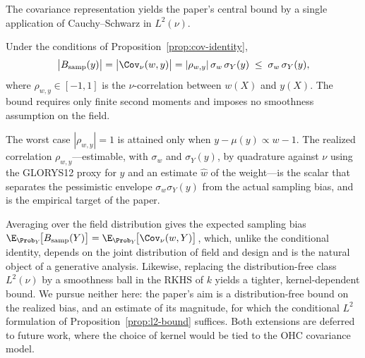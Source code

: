 The covariance representation yields the paper's central bound by a
single application of Cauchy--Schwarz in $L^2(\nu)$.

\begin{proposition}
\label{prop:l2-bound}
Under the conditions of Proposition~\ref{prop:cov-identity},
\[
  \big|B_{\mathrm{samp}}(y)\big|
  = \big|\Cov_\nu(w,y)\big|
  = |\rho_{w,y}|\,\sigma_w\,\sigma_Y(y)
  \;\le\; \sigma_w\,\sigma_Y(y),
\]
where $\rho_{w,y}\in[-1,1]$ is the $\nu$-correlation between $w(X)$ and
$y(X)$. The bound requires only finite second moments and imposes no
smoothness assumption on the field.
\end{proposition}

The worst case $|\rho_{w,y}|=1$ is attained only when $y-\mu(y)\propto
w-1$. The realized correlation $\rho_{w,y}$---estimable, with
$\sigma_w$ and $\sigma_Y(y)$, by quadrature against $\nu$ using the
GLORYS12 proxy for $y$ and an estimate $\hat w$ of the weight---is the
scalar that separates the pessimistic envelope $\sigma_w\sigma_Y(y)$
from the actual sampling bias, and is the empirical target of the paper.

\begin{remark}
\label{rem:expected}
Averaging over the field distribution gives the expected sampling bias
$\E_{\Prob_Y}\!\big[B_{\mathrm{samp}}(Y)\big]
= \E_{\Prob_Y}\!\big[\Cov_\nu(w,Y)\big]$, which, unlike the conditional
identity, depends on the joint distribution of field and design and is the
natural object of a generative analysis. Likewise, replacing the
distribution-free class $L^2(\nu)$ by a smoothness ball in the RKHS of
$k$ yields a tighter, kernel-dependent bound. We pursue neither here:
the paper's aim is a distribution-free bound on the realized bias, and
an estimate of its magnitude, for which the conditional $L^2$
formulation of Proposition~\ref{prop:l2-bound} suffices. Both
extensions are deferred to future work, where the choice of kernel
would be tied to the OHC covariance model.
\end{remark}
